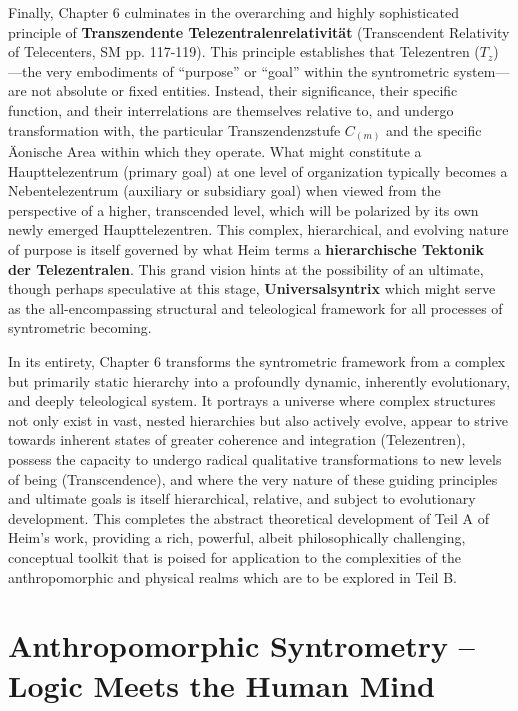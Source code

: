 \documentclass[12pt]{article}
\newcommand{\q}[1]{\enquote{#1}}
\newcommand{\telezentrum}{T_z}
\begin{document}
Finally, Chapter 6 culminates in the overarching and highly sophisticated principle of \textbf{Transzendente Telezentralenrelativität} (Transcendent Relativity of Telecenters, SM pp. 117-119). This principle establishes that Telezentren (\(\telezentrum\))—the very embodiments of \q{purpose} or \q{goal} within the syntrometric system—are not absolute or fixed entities. Instead, their significance, their specific function, and their interrelations are themselves relative to, and undergo transformation with, the particular Transzendenzstufe \( C_{(m)} \) and the specific Äonische Area within which they operate. What might constitute a Haupttelezentrum (primary goal) at one level of organization typically becomes a Nebentelezentrum (auxiliary or subsidiary goal) when viewed from the perspective of a higher, transcended level, which will be polarized by its own newly emerged Haupttelezentren. This complex, hierarchical, and evolving nature of purpose is itself governed by what Heim terms a \textbf{hierarchische Tektonik der Telezentralen}. This grand vision hints at the possibility of an ultimate, though perhaps speculative at this stage, \textbf{Universalsyntrix} which might serve as the all-encompassing structural and teleological framework for all processes of syntrometric becoming.

In its entirety, Chapter 6 transforms the syntrometric framework from a complex but primarily static hierarchy into a profoundly dynamic, inherently evolutionary, and deeply teleological system. It portrays a universe where complex structures not only exist in vast, nested hierarchies but also actively evolve, appear to strive towards inherent states of greater coherence and integration (Telezentren), possess the capacity to undergo radical qualitative transformations to new levels of being (Transcendence), and where the very nature of these guiding principles and ultimate goals is itself hierarchical, relative, and subject to evolutionary development. This completes the abstract theoretical development of Teil A of Heim's work, providing a rich, powerful, albeit philosophically challenging, conceptual toolkit that is poised for application to the complexities of the anthropomorphic and physical realms which are to be explored in Teil B.

\clearpage 
\section{Anthropomorphic Syntrometry – Logic Meets the Human Mind}
\label{sec:chapter7}
\end{document}
